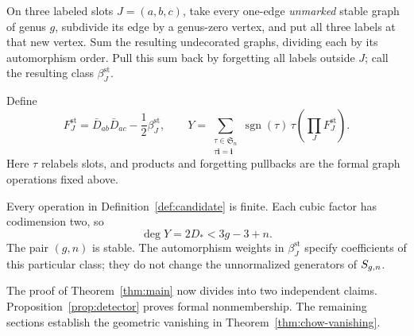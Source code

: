 \begin{definition}\label{def:candidate}
On three labeled slots \(J=(a,b,c)\), take every one-edge
\emph{unmarked} stable graph of genus \(g\), subdivide its edge by
a genus-zero vertex, and put all three labels at that new vertex.
Sum the resulting undecorated graphs, dividing each by its automorphism
order. Pull this sum back by forgetting all labels outside \(J\);
call the resulting class \(\beta_J^{\mathrm{st}}\).

Define
\begin{equation}\label{eq:candidate}
F_J^{\mathrm{st}}=
\bar D_{ab}\bar D_{ac}-\frac12\beta_J^{\mathrm{st}},
\qquad
Y=\sum_{\substack{\tau\in\mathfrak S_n\\\tau\mathbf i=\mathbf i}}
\operatorname{sgn}(\tau)\,
\tau\left(\prod_J F_J^{\mathrm{st}}\right).
\end{equation}
Here \(\tau\) relabels slots, and products and forgetting pullbacks
are the formal graph operations fixed above.
\end{definition}

Every operation in Definition~\ref{def:candidate} is finite.
Each cubic factor has codimension two, so
\[
\deg Y=2D_*<3g-3+n.
\]
The pair \((g,n)\) is stable. The automorphism weights in
\(\beta_J^{\mathrm{st}}\) specify coefficients of this particular
class; they do not change the unnormalized generators of
\(S_{g,n}\).

The proof of Theorem~\ref{thm:main} now divides into two independent
claims. Proposition~\ref{prop:detector} proves formal nonmembership.
The remaining sections establish the geometric vanishing
in Theorem~\ref{thm:chow-vanishing}.
